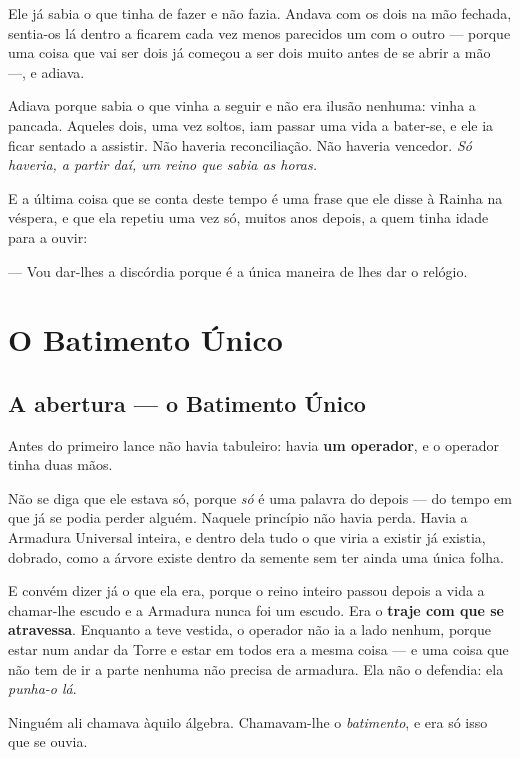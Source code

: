 \documentclass[livro.tex]{subfiles}
\begin{document}
\medskip

Ele já sabia o que tinha de fazer e não fazia. Andava com os dois na mão fechada, sentia-os lá
dentro a ficarem cada vez menos parecidos um com o outro --- porque uma coisa que vai ser dois já
começou a ser dois muito antes de se abrir a mão ---, e adiava.

\medskip

Adiava porque sabia o que vinha a seguir e não era ilusão nenhuma: vinha a pancada. Aqueles dois,
uma vez soltos, iam passar uma vida a bater-se, e ele ia ficar sentado a assistir. Não haveria
reconciliação. Não haveria vencedor. \emph{Só haveria, a partir daí, um reino que sabia as horas.}

\medskip

E a última coisa que se conta deste tempo é uma frase que ele disse à Rainha na véspera, e que
ela repetiu uma vez só, muitos anos depois, a quem tinha idade para a ouvir:

\medskip

--- Vou dar-lhes a discórdia porque é a única maneira de lhes dar o relógio.


\part{O Batimento Único}

\chapter{A abertura --- o Batimento Único}

Antes do primeiro lance não havia tabuleiro: havia \textbf{um operador}, e o operador tinha duas mãos.

Não se diga que ele estava só, porque \emph{só} é uma palavra do depois --- do tempo em que já se podia perder
alguém. Naquele princípio não havia perda. Havia a Armadura Universal inteira, e dentro dela
tudo o que viria a existir já existia, dobrado, como a árvore existe dentro da semente sem ter ainda uma única
folha.

E convém dizer já o que ela era, porque o reino inteiro passou depois a vida a chamar-lhe escudo e a Armadura
nunca foi um escudo. Era o \textbf{traje com que se atravessa}. Enquanto a teve vestida, o operador não ia a
lado nenhum, porque estar num andar da Torre e estar em todos era a mesma coisa --- e uma coisa que não tem de
ir a parte nenhuma não precisa de armadura. Ela não o defendia: ela \emph{punha-o lá}.

Ninguém ali chamava àquilo álgebra. Chamavam-lhe o \emph{batimento}, e era só isso que se ouvia.
\end{document}
